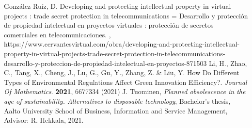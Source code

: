 \documentclass[10pt,journal,compsoc]{IEEEtran}
\begin{document}
\begin{thebibliography}{1}
González Ruíz, D. Developing and protecting intellectual property in virtual projects : trade secret protection in telecommunications = Desarrollo y protección de propiedad intelectual en proyectos virtuales : protección de secretos comerciales en telecomunicaciones. , https://www.cervantesvirtual.com/obra/developing-and-protecting-intellectual-property-in-virtual-projects-trade-secret-protection-in-telecommunications-desarrollo-y-proteccion-de-propiedad-intelectual-en-proyectos-871503
Li, H., Zhao, C., Tang, X., Cheng, J., Lu, G., Gu, Y., Zhang, Z. \& Liu, Y. How Do Different Types of Environmental Regulations Affect Green Innovation Efficiency?. {\em Journal Of Mathematics}. \textbf{2021}, 6677334 (2021)
J. Tuominen, \emph{Planned obsolescence in the age of sustainability. Alternatives to disposable technology}, Bachelor's thesis, Aalto University School of Business, Information and Service Management, Advisor: R. Hekkala, 2021.

\end{thebibliography}

% 



\end{document}
